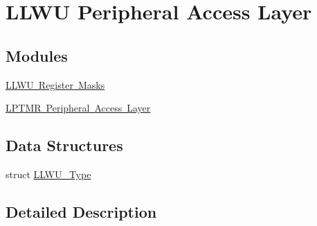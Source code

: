 \hypertarget{group___l_l_w_u___peripheral___access___layer}{}\section{L\+L\+WU Peripheral Access Layer}
\label{group___l_l_w_u___peripheral___access___layer}
\subsection*{Modules}
\begin{DoxyCompactItemize}
\item 
\mbox{\hyperlink{group___l_l_w_u___register___masks}{L\+L\+W\+U Register Masks}}
\item 
\mbox{\hyperlink{group___l_p_t_m_r___peripheral___access___layer}{L\+P\+T\+M\+R Peripheral Access Layer}}
\end{DoxyCompactItemize}
\subsection*{Data Structures}
\begin{DoxyCompactItemize}
\item 
struct \mbox{\hyperlink{struct_l_l_w_u___type}{L\+L\+W\+U\+\_\+\+Type}}
\end{DoxyCompactItemize}


\subsection{Detailed Description}
